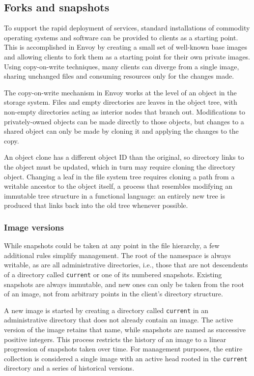 \subsection{Forks and snapshots}\label{sec:snapshots}

To support the rapid deployment of services, standard installations of commodity operating systems and software can be provided to clients as a starting point. This is accomplished in Envoy by creating a small set of well-known base images and allowing clients to fork them as a starting point for their own private images. Using copy-on-write techniques, many clients can diverge from a single image, sharing unchanged files and consuming resources only for the changes made.

The copy-on-write mechanism in Envoy works at the level of an object in the storage system. Files and empty directories are leaves in the object tree, with non-empty directories acting as interior nodes that branch out. Modifications to privately-owned objects can be made directly to those objects, but changes to a shared object can only be made by cloning it and applying the changes to the copy.

An object clone has a different object ID than the original, so directory links to the object must be updated, which in turn may require cloning the directory object. Changing a leaf in the file system tree requires cloning a path from a writable ancestor to the object itself, a process that resembles modifying an immutable tree structure in a functional language: an entirely new tree is produced that links back into the old tree whenever possible.

\subsubsection{Image versions}

While snapshots could be taken at any point in the file hierarchy, a few additional rules simplify management. The root of the namespace is always writable, as are all administrative directories, i.e., those that are not descendents of a directory called \texttt{current} or one of its numbered snapshots. Existing snapshots are always immutable, and new ones can only be taken from the root of an image, not from arbitrary points in the client's directory structure.

A new image is started by creating a directory called \texttt{current} in an administrative directory that does not already contain an image. The active version of the image retains that name, while snapshots are named as successive positive integers. This process restricts the history of an image to a linear progression of snapshots taken over time. For management purposes, the entire collection is considered a single image with an active head rooted in the \texttt{current} directory and a series of historical versions.

